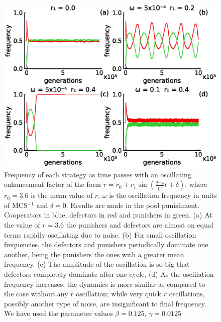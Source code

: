 \begin{figure}
	\centering
	\includegraphics[width=1\linewidth]{Images/P2/freq_tiempo_T0seleccion_Pool.eps}
	\caption{Frequency of each strategy as time passes with an oscillating enhancement factor of the form $r=r_0+r_1\sin(\frac{2\pi \omega}{L^2}t+\delta)$, where  $r_0=3.6$ is the mean value of $r$, $\omega$ is the oscillation frequency in units of MCS$^{-1}$ and $\delta=0$. Results are made in the pool punishment. Cooperators in blue, defectors in red and punishers in green. (a) At the value of $r=3.6$ the punishers and defectors are almost on equal terms rapidly oscillating due to noise. (b) For small oscillation frequencies, the defectors and punishers periodically dominate one another, being the punishers the ones with a greater mean frequency. (c) The amplitude of the oscillation is so big that defectors completely dominate after one cycle. (d) As the oscillation frequency increases, the dynamics is more similar as compared to the case without any $r$ oscillation; while very quick $r$ oscillations, possibly another type of noise, are insignificant to final frequency. We have used the parameter values $\beta=0.125$, $\gamma=0.0125$}
	\label{oscila}
\end{figure}



